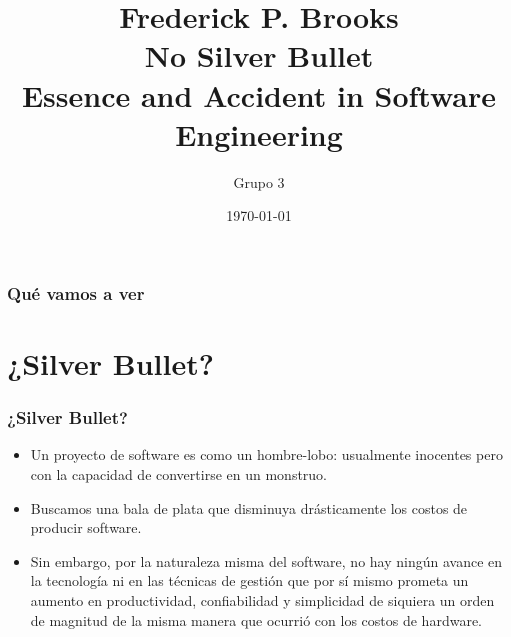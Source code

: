 \documentclass{beamer}
\title[No Silver Bullet]{Frederick P. Brooks \\ No Silver Bullet \\ Essence and Accident in Software Engineering} %
\author{Grupo 3} %
\institute[UBA - ISW2] %
{
Ingeniería de Software II - 1er Cuatrimestre 2016 \\ %
\medskip
\textit{} %
}
\date{\today} %
\begin{document}
\begin{frame}
\titlepage %
\end{frame}

\begin{frame}
\frametitle{Qué vamos a ver} %
\tableofcontents %
\end{frame}


\section{¿Silver Bullet?}
\begin{frame}
\frametitle{¿Silver Bullet?}

\begin{itemize}

\item Un proyecto de software es como un hombre-lobo: usualmente inocentes pero con la capacidad de convertirse en un monstruo.\\
\item Buscamos una bala de plata que disminuya drásticamente los costos de producir software.\\
\item Sin embargo, por la naturaleza misma del software, no hay ningún avance en la tecnología ni en las técnicas de gestión que por sí mismo prometa un aumento en productividad, confiabilidad y simplicidad de siquiera un orden de magnitud de la misma manera que ocurrió con los costos de hardware.\\
\end{itemize}

\end{frame}
\end{document}
